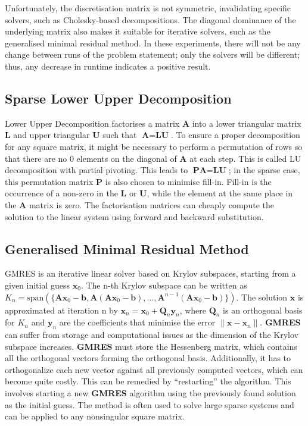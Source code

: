 Unfortunately, the discretisation matrix is not symmetric, invalidating specific solvers, such as Cholesky-based decompositions. The diagonal dominance of the underlying matrix also makes it suitable for iterative solvers, such as the generalised minimal residual method. In these experiments, there will not be any change between runs of the problem statement; only the solvers will be different; thus, any decrease in runtime indicates a positive result.

\subsection{Sparse Lower Upper Decomposition}
Lower Upper Decomposition factorises a matrix $\textbf{A}$ into a lower triangular matrix $\textbf{L}$ and upper triangular $\textbf{U}$ such that $\textbf{A} = \textbf{LU}$. To ensure a proper decomposition for any square matrix, it might be necessary to perform a permutation  of rows so that there are no 0 elements on the diagonal of $\textbf{A}$ at each step. This is called LU decomposition with partial pivoting. This leads to $\textbf{PA} = \textbf{LU}$; in the sparse case, this permutation matrix $\textbf{P}$ is also chosen to minimise fill-in. Fill-in is the occurrence of a non-zero in the $\textbf{L}$ or $\textbf{U}$, while the element at the same place in the $\textbf{A}$ matrix is zero. The factorisation matrices can cheaply compute the solution to the linear system using forward and backward substitution.

\subsection{Generalised Minimal Residual Method}
GMRES is an iterative linear solver based on Krylov subspaces, starting from a given initial guess $\textbf{x}_0$. The n-th Krylov subspace can be written as $K_n = \mathrm{span}(\{\textbf{A}\textbf{x}_0-\textbf{b}, \textbf{A}(\textbf{A}\textbf{x}_0-\textbf{b}),...,\textbf{A}^{n-1}(\textbf{A}\textbf{x}_0-\textbf{b})\})$. The solution $\textbf{x}$ is approximated at iteration n by $\textbf{x}_n = \textbf{x}_0 + \textbf{Q}_n \textbf{y}_n$, where $\textbf{Q}_n$ is an orthogonal basis for $K_n$ and $\textbf{y}_n$ are the coefficients that minimise the error $\|\textbf{x}-\textbf{x}_n\|$. \textbf{GMRES} can suffer from storage and computational issues as the dimension of the Krylov subspace increases. \textbf{GMRES} must store the Hessenberg matrix, which contains all the orthogonal vectors forming the orthogonal basis. Additionally, it has to orthogonalize each new vector against all previously computed vectors, which can become quite costly. This can be remedied by ``restarting'' the algorithm. This involves starting a new \textbf{GMRES} algorithm using the previously found solution as the initial guess. The method is often used to solve large sparse systems and can be applied to any nonsingular square matrix.



